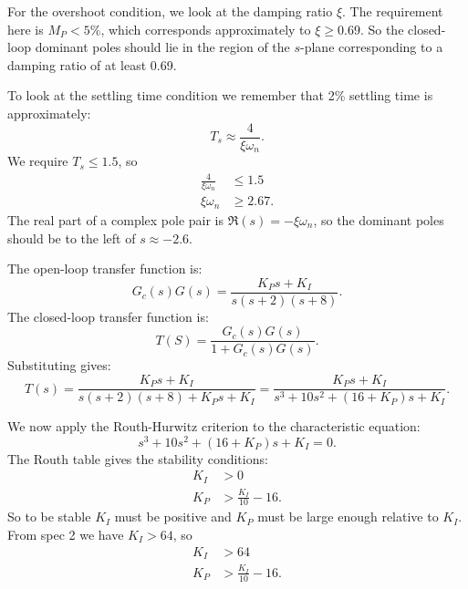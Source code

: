 \begin{exa}
  For the overshoot condition, we look at the damping ratio $\xi$.
  The requirement here is $M_P < 5\%$, which corresponds approximately to $\xi \geq \num{0,69} $.
  So the closed-loop dominant poles should lie in the region of the $s$-plane corresponding to a damping ratio of at least \num{0,69}.

  To look at the settling time condition we remember that 2\% settling time is approximately:
  \begin{equation*}
    T_s \approx \frac{4}{\xi \omega_n}
  .\end{equation*}
  We require $T_s \leq \num{1,5}$, so
  \begin{align*}
    \frac{4}{\xi \omega_n} &\leq \num{1,5} \\
    \xi \omega_n &\geq \num{2,67} 
  .\end{align*}
  The real part of a complex pole pair is $\Re(s) = - \xi \omega_n$, so the dominant poles should be to the left of $s \approx - \num{2,6}$. 

  The open-loop transfer function is:
  \begin{equation*}
    G_c(s) G(s) = \frac{K_P s + K_I}{s(s+2)(s+8)}
  .\end{equation*}
  The closed-loop transfer function is:
  \begin{equation*}
    T(S) = \frac{G_c(s) G(s)}{1 + G_c(s) G(s)}
  .\end{equation*}
  Substituting gives:
  \begin{equation*}
    T(s) = \frac{K_P s + K_I}{s(s+2)(s+8) + K_P s + K_I} = \frac{K_P s + K_I}{s^3 + 10s^2 + (16 + K_P)s + K_I}
  .\end{equation*}
  
  We now apply the Routh-Hurwitz criterion to the characteristic equation:
  \begin{equation*}
    s^3 + 10s^2 + (16 + K_P)s + K_I = 0
  .\end{equation*}
  The Routh table gives the stability conditions:
  \begin{align*}
    K_I &> 0 \\
    K_P &>  \frac{K_I}{10} - 16
  .\end{align*}
  So to be stable $K_I$ must be positive and $K_P$ must be large enough relative to $K_I$.
  From spec 2 we have $K_I > 64$, so
  \begin{align*}
    K_I &> 64 \\
    K_P &>  \frac{K_I}{10} - 16
  .\end{align*}


\end{exa}
